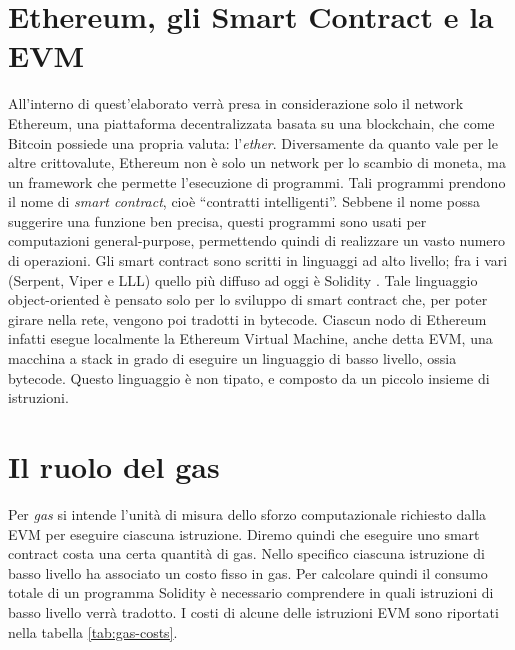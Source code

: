 \section{Ethereum, gli Smart Contract e la EVM}

All'interno di quest'elaborato verrà presa in considerazione solo il network Ethereum, una piattaforma decentralizzata basata su una blockchain, che come Bitcoin possiede una propria valuta: l'\textit{ether}.\newline 
Diversamente da quanto vale per le altre crittovalute, Ethereum non è solo un network per lo scambio di moneta, ma un framework che permette l'esecuzione di programmi. Tali programmi prendono il nome di \textit{smart contract}, cioè ``contratti intelligenti''. Sebbene il nome possa suggerire una funzione ben precisa, questi programmi sono usati per computazioni general-purpose, permettendo quindi di realizzare un vasto numero di operazioni.\newline
Gli smart contract sono scritti in linguaggi ad alto livello; fra i vari (Serpent, Viper e LLL) quello più diffuso ad oggi è Solidity \cite{K3}. 
Tale linguaggio object-oriented è pensato solo per lo sviluppo di smart contract che, per poter girare nella rete, vengono poi tradotti in bytecode. Ciascun nodo di Ethereum infatti esegue localmente la Ethereum Virtual Machine, anche detta EVM, una macchina a stack in grado di eseguire un linguaggio di basso livello, ossia bytecode. Questo linguaggio è non tipato, e composto da un piccolo insieme di istruzioni.\newline 

\section{Il ruolo del gas}

Per \textit{gas} si intende l'unità di misura dello sforzo computazionale richiesto dalla EVM per eseguire ciascuna istruzione. Diremo quindi che eseguire uno smart contract costa una certa quantità di gas.\newline
Nello specifico ciascuna istruzione di basso livello ha associato un costo fisso in gas. Per calcolare quindi il consumo totale di un programma Solidity è necessario comprendere in quali istruzioni di basso livello verrà tradotto.\newline
I costi di alcune delle istruzioni EVM \cite{K4} sono riportati nella tabella \ref{tab:gas-costs}.

